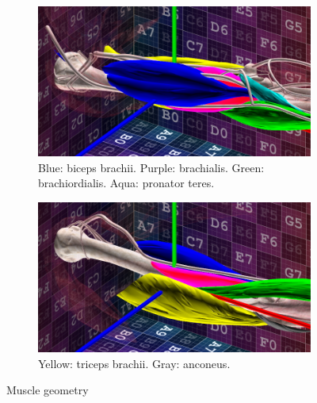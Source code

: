 \begin{figure}[t]
    \centering
    \begin{subfigure}[t]{0.45\textwidth}
        \centering
        \includegraphics[width=\textwidth]{./Figures/musclesFront.jpg}
        \caption{Blue: biceps brachii. Purple: brachialis. Green: brachiordialis. Aqua: pronator teres.}
        \label{fig:musclesFront}
    \end{subfigure}
\hfill
    \begin{subfigure}[t]{0.45\textwidth}
        \centering
        \includegraphics[width=\textwidth]{./Figures/musclesBack.jpg}
        \caption{Yellow: triceps brachii. Gray: anconeus.}
        \label{fig:musclesBack}
    \end{subfigure}

    \caption{Muscle geometry}
    \label{fig:muscleView}
\end{figure}

